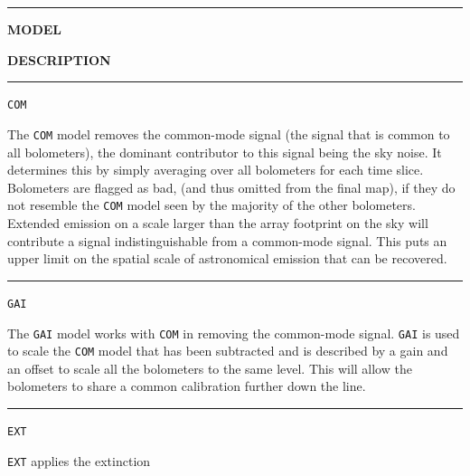 \documentclass[twoside,11pt]{article}
\newenvironment{latexonly}{}{}
\renewcommand{\_}{\texttt{\symbol{95}}}
\newcommand{\model}[1]{\texttt{#1}}
\begin{document}
\\ \\
\begin{latexonly}
\hrule
\begin{minipage}[t]{0.12\linewidth}
\centering\textbf{MODEL}
\vspace{6pt}
\end{minipage}
\begin{minipage}[t]{0.88\linewidth}
\centering\textbf{DESCRIPTION}
\vspace{6pt}
\end{minipage}
\hrule
\begin{minipage}[t]{0.12\linewidth}
\centering\model{COM}
\end{minipage}
\begin{minipage}[t]{0.88\linewidth}The \model{COM} model removes the
common-mode signal (the signal that is common to all bolometers), the
dominant contributor to this signal being the sky noise. It determines
this by simply averaging over all bolometers for each time slice.
Bolometers are flagged as bad, (and thus omitted from the final map), if
they do not resemble the \model{COM} model seen by the majority of the
other bolometers.
\newline Extended emission on a scale larger than the array footprint
on the sky will contribute a signal indistinguishable from a
common-mode signal. This puts an upper limit on the spatial scale of
astronomical emission that can be recovered. \\
\end{minipage}
\hrule
\vspace{0.1cm}
\begin{minipage}[t]{0.12\linewidth}
\centering\model{GAI}
\end{minipage}
\begin{minipage}[t]{0.88\linewidth}The \model{GAI} model works with
\model{COM} in removing the common-mode signal. \model{GAI} is used to
scale the \model{COM} model that has been subtracted and is described by
a gain and an offset to scale all the bolometers to the same level. This
will allow the bolometers to share a common calibration further down the
line. \\
\end{minipage}
\hrule
\vspace{0.1cm}
\begin{minipage}[t]{0.12\linewidth}
\centering\model{EXT}
\end{minipage}
\begin{minipage}[t]{0.88\linewidth}\model{EXT} applies the extinction

\end{minipage}
\end{latexonly}
\end{document}
